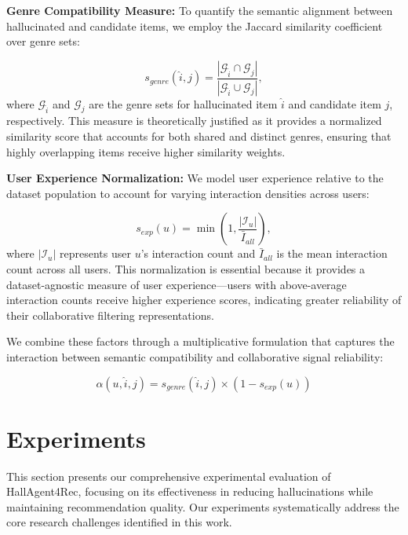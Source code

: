 \documentclass[acmsmall]{acmart}
\begin{document}
\textbf{Genre Compatibility Measure:} To quantify the semantic alignment between hallucinated and candidate items, we employ the Jaccard similarity coefficient over genre sets:

\begin{equation}
s_{genre}(\hat{i}, j) = \frac{|\mathcal{G}_{\hat{i}} \cap \mathcal{G}_j|}{|\mathcal{G}_{\hat{i}} \cup \mathcal{G}_j|},
\label{eq:genre_jaccard}
\end{equation}
where $\mathcal{G}_{\hat{i}}$ and $\mathcal{G}_j$ are the genre sets for hallucinated item $\hat{i}$ and candidate item $j$, respectively. This measure is theoretically justified as it provides a normalized similarity score that accounts for both shared and distinct genres, ensuring that highly overlapping items receive higher similarity weights.

\textbf{User Experience Normalization:} We model user experience relative to the dataset population to account for varying interaction densities across users:

\begin{equation}
s_{exp}(u) = \min\left(1, \frac{|\mathcal{I}_u|}{\bar{I}_{all}}\right),
\label{eq:experience_normalization}
\end{equation}
where $|\mathcal{I}_u|$ represents user $u$'s interaction count and $\bar{I}_{all}$ is the mean interaction count across all users. This normalization is essential because it provides a dataset-agnostic measure of user experience—users with above-average interaction counts receive higher experience scores, indicating greater reliability of their collaborative filtering representations.

 We combine these factors through a multiplicative formulation that captures the interaction between semantic compatibility and collaborative signal reliability:

\begin{equation}
\alpha(u, \hat{i}, j) = s_{genre}(\hat{i}, j) \times (1 - s_{exp}(u))
\label{eq:theoretical_alpha}
\end{equation}

\section{Experiments}

This section presents our comprehensive experimental evaluation of HallAgent4Rec, focusing on its effectiveness in reducing hallucinations while maintaining recommendation quality. Our experiments systematically address the core research challenges identified in this work.
\end{document}
